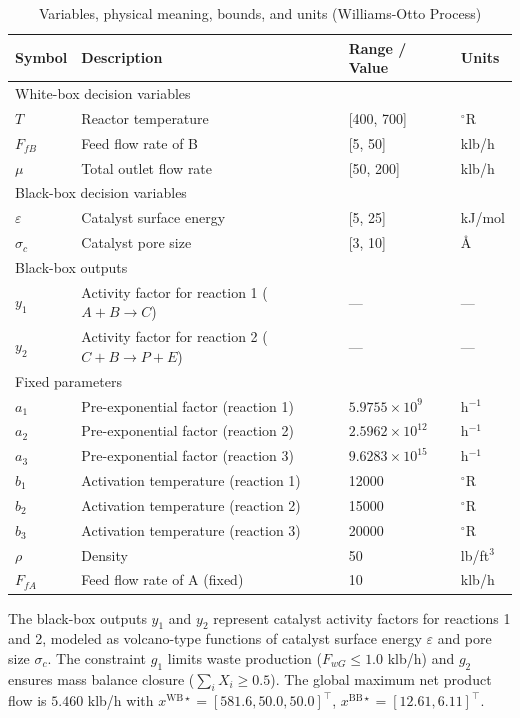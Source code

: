\documentclass[12pt,a4paper]{article}%
\theoremstyle{plain}%
\theoremstyle{remark}%
\theoremstyle{definition}%
\def\WB{\mathrm{WB}}
\def\BB{\mathrm{BB}}
\begin{document}
\begin{appendices}
\begin{table}[htbp]
\centering
\caption{Variables, physical meaning, bounds, and units (Williams-Otto Process)}
\label{tab:williams_otto_vars}
\begin{tabular}{@{}llll@{}}
\toprule
\textbf{Symbol} & \textbf{Description} & \textbf{Range / Value} & \textbf{Units} \\
\midrule
\multicolumn{4}{l}{White-box decision variables} \\
\midrule
$T$ & Reactor temperature & [400, 700] & $^\circ$R \\
$F_{fB}$ & Feed flow rate of B & [5, 50] & klb/h \\
$\mu$ & Total outlet flow rate & [50, 200] & klb/h \\
\midrule
\multicolumn{4}{l}{Black-box decision variables} \\
\midrule
$\varepsilon$ & Catalyst surface energy & [5, 25] & kJ/mol \\
$\sigma_c$ & Catalyst pore size & [3, 10] & \AA \\
\midrule
\multicolumn{4}{l}{Black-box outputs} \\
\midrule
$y_1$ & Activity factor for reaction 1 ($A + B \to C$) & --- & --- \\
$y_2$ & Activity factor for reaction 2 ($C + B \to P + E$) & --- & --- \\
\midrule
\multicolumn{4}{l}{Fixed parameters} \\
\midrule
$a_1$ & Pre-exponential factor (reaction 1) & $5.9755 \times 10^9$ & h$^{-1}$ \\
$a_2$ & Pre-exponential factor (reaction 2) & $2.5962 \times 10^{12}$ & h$^{-1}$ \\
$a_3$ & Pre-exponential factor (reaction 3) & $9.6283 \times 10^{15}$ & h$^{-1}$ \\
$b_1$ & Activation temperature (reaction 1) & 12000 & $^\circ$R \\
$b_2$ & Activation temperature (reaction 2) & 15000 & $^\circ$R \\
$b_3$ & Activation temperature (reaction 3) & 20000 & $^\circ$R \\
$\rho$ & Density & 50 & lb/ft$^3$ \\
$F_{fA}$ & Feed flow rate of A (fixed) & 10 & klb/h \\
\bottomrule
\end{tabular}
\end{table}

The black-box outputs $y_1$ and $y_2$ represent catalyst activity factors for reactions 1 and 2, modeled as volcano-type functions of catalyst surface energy $\varepsilon$ and pore size $\sigma_c$. The constraint $g_1$ limits waste production ($F_{wG} \leq 1.0$ klb/h) and $g_2$ ensures mass balance closure ($\sum_i X_i \geq 0.5$). The global maximum net product flow is $5.460$ klb/h with $x^{\WB\star} = [581.6, 50.0, 50.0]^\top$, $x^{\BB\star} = [12.61, 6.11]^\top$.


\end{appendices}
\end{document}
